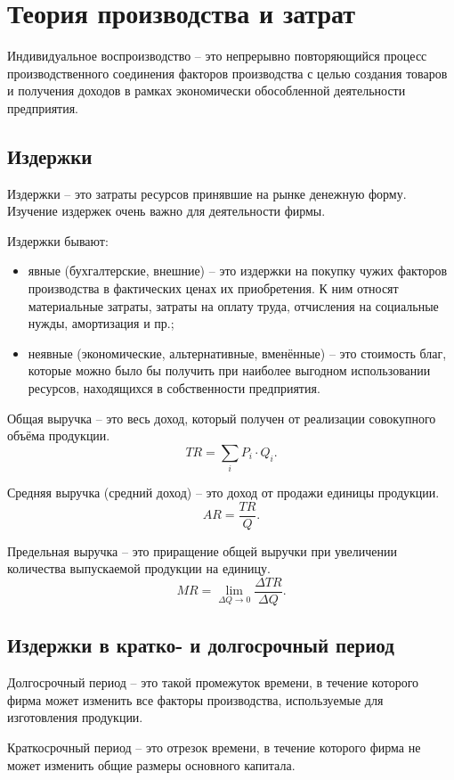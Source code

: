 \section{Теория производства и затрат}
Индивидуальное воспроизводство -- это непрерывно повторяющийся процесс
производственного соединения факторов производства с целью создания товаров
и получения доходов в рамках экономически обособленной деятельности предприятия.

\subsection{Издержки}
Издержки -- это затраты ресурсов принявшие на рынке денежную форму. Изучение
издержек очень важно для деятельности фирмы.

Издержки бывают:
\begin{itemize}
    \item явные (бухгалтерские, внешние) -- это издержки на покупку чужих
    факторов производства в фактических ценах их приобретения. К ним относят
    материальные затраты, затраты на оплату труда, отчисления на социальные
    нужды, амортизация и пр.;
    \item неявные (экономические, альтернативные, вменённые) -- это стоимость
    благ, которые можно было бы получить при наиболее выгодном использовании
    ресурсов, находящихся в собственности предприятия. 
\end{itemize}

Общая выручка -- это весь доход, который получен от реализации совокупного
объёма продукции.
\[
    TR = \sum_i P_i \cdot Q_i.
\]

Средняя выручка (средний доход) -- это доход от продажи единицы продукции.
\[
    AR = \frac{TR}{Q}.
\]

Предельная выручка -- это приращение общей выручки при увеличении количества
выпускаемой продукции на единицу.
\[
    MR = \lim_{\Delta Q \rightarrow 0} \frac{\Delta TR}{\Delta Q}.
\]

\subsection{Издержки в кратко- и долгосрочный период}
Долгосрочный период -- это  такой промежуток времени, в течение которого фирма
может изменить все факторы производства, используемые для изготовления продукции.

Краткосрочный период -- это отрезок времени, в течение которого фирма не может
изменить общие размеры основного капитала.

